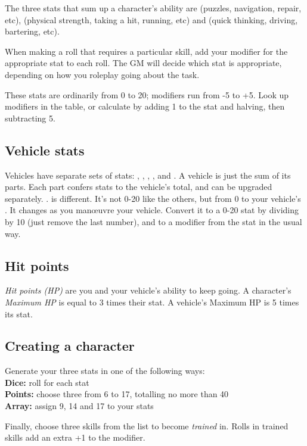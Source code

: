 \documentclass[10pt, a4paper, twocolumn]{article}
\begin{document}
The three stats that sum up a character's ability are  (puzzles,
navigation, repair,  etc),  (physical strength, taking a hit,
running, etc) and  (quick thinking, driving, bartering, etc).

When making a roll that requires a particular skill, add your modifier for the
appropriate stat to each roll. The GM will decide which stat is appropriate,
depending on how you roleplay going about the task.

These stats are ordinarily from 0 to 20; modifiers run from -5 to +5. Look up
modifiers in the table, or calculate by adding 1 to the stat and halving, then subtracting 5.

\subsection{Vehicle stats}
Vehicles have separate sets of stats: , ,
, ,  and . A vehicle
is just the sum of its parts. Each part confers stats to the vehicle's total,
and can be upgraded separately.
.
 is different. It's not 0-20 like the others, but from 0 to your
vehicle's . It changes as you man\oe{}uvre your vehicle.
Convert it to a 0-20 stat by dividing by 10 (just remove the last number), and
to a modifier from the stat in the usual way.

\subsection{Hit points}
\emph{Hit points (HP)} are you and your vehicle's ability to keep going. A
character's \emph{Maximum HP} is equal to 3 times their  stat. A
vehicle's Maximum HP is 5 times its  stat.

\subsection{Creating a character}
Generate your three stats in one of the following ways:\\
\textbf{Dice:} roll  for each stat\\
\textbf{Points:} choose three from 6 to 17, totalling no more than 40\\
\textbf{Array:} assign 9, 14 and 17 to your stats

Finally, choose three skills from the list to become \emph{trained} in. Rolls in
trained skills add an extra +1 to the modifier.
\end{document}

